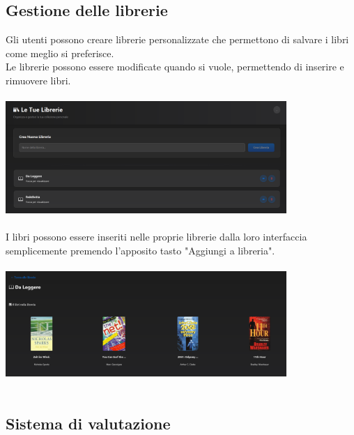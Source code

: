 \documentclass[12pt,a4paper]{article}
\begin{document}
\subsection{Gestione delle librerie}

Gli utenti possono creare librerie personalizzate che permettono di salvare i libri come meglio si preferisce.
\\Le librerie possono essere modificate quando si vuole, permettendo di inserire e rimuovere libri.
\\
\\\includegraphics[width=0.8\textwidth]{img/librerie}
\\
\\I libri possono essere inseriti nelle proprie librerie dalla loro interfaccia semplicemente premendo l'apposito tasto "Aggiungi a libreria".
\\
\\\includegraphics[width=0.8\textwidth]{img/SpecLibreria}
\\
\\
\subsection{Sistema di valutazione}
\end{document}
